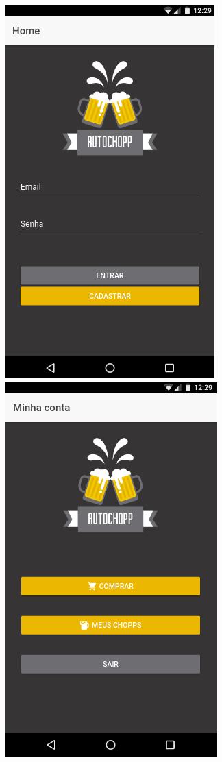 \begin{figure}[!htb]
    \centering
    \includegraphics[scale= 0.3]{figuras/Aplicativo/home.png}
    \includegraphics[scale= 0.3]{figuras/Aplicativo/home-loged.png}       

\end{figure}
